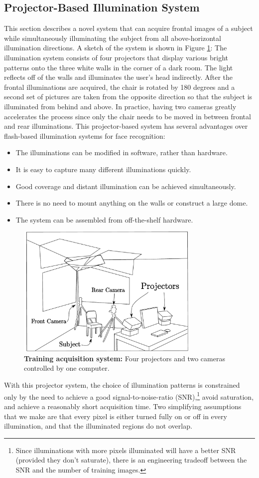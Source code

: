 \subsection{Projector-Based Illumination System}
%
This section describes a novel system that can acquire frontal images of a
subject while simultaneously illuminating the subject from all above-horizontal
illumination directions. A sketch of the system is shown in Figure
\ref{fig:system}: The illumination system consists of four projectors that
display various bright patterns onto the three white walls in the corner of a
dark room.  The light reflects off of the walls and illuminates the user's head
indirectly.  After the frontal illuminations are acquired, the chair is rotated by
180 degrees and a second set of pictures are taken from the opposite direction
so that the subject is illuminated from behind and above.  In practice, having
two cameras greatly accelerates the process since only the chair needs to be
moved in between frontal and rear illuminations. This projector-based system
has several advantages over flash-based illumination systems for face
recognition:
\begin{itemize}
\item The illuminations can be modified in software, rather than hardware.
\item It is easy to capture many different illuminations quickly.
\item Good coverage and distant illumination can be achieved simultaneously.
\item There is no need to mount anything on the walls or construct a large dome.
\item The system can be assembled from off-the-shelf hardware.
\end{itemize}
\begin{figure}
\centering
\includegraphics[height=2.5in]{figures_pami/camera_rig.pdf}
\caption{\small{\bf Training acquisition system:} Four projectors and two cameras controlled by one computer.}
\label{fig:system}
\end{figure}
%
With this projector system, the choice of illumination patterns is constrained
only by the need to achieve a good signal-to-noise-ratio (SNR),\footnote{Since
illuminations with more pixels illuminated will have a better SNR (provided
they don't saturate), there is an engineering tradeoff between the SNR and the
number of training images.} avoid saturation, and achieve a reasonably short
acquisition time.  Two simplifying assumptions that we make are that every
pixel is either turned fully on or off in every illumination, and that the
illuminated regions do not overlap.

